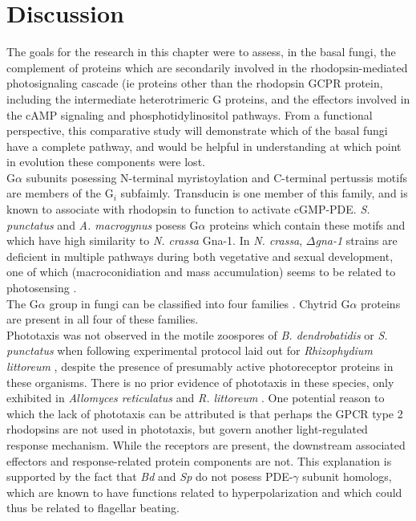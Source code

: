 \section{Discussion}
The goals for the research in this chapter were to assess, in the basal fungi, the complement of proteins which are secondarily involved in the rhodopsin-mediated photosignaling cascade (ie proteins other than the rhodopsin GCPR protein, including the intermediate heterotrimeric G proteins, and the effectors involved in the cAMP signaling and phosphotidylinositol pathways. From a functional perspective, this comparative study will demonstrate which of the basal fungi have a complete pathway, and would be helpful in understanding at which point in evolution these components were lost.\\
\indent G$\alpha$ subunits posessing N-terminal myristoylation and C-terminal pertussis motifs are members of the G$_{i}$ subfaimly. Transducin is one member of this family, and is known to associate with rhodopsin to function to activate cGMP-PDE. \textit{S. punctatus} and \textit{A. macrogynus} posess G$\alpha$ proteins which contain these motifs and which have high similarity to \textit{N. crassa} Gna-1. In \textit{N. crassa}, \emph{$\Delta$gna-1} strains are deficient in multiple pathways during both vegetative and sexual development, one of which (macroconidiation and mass accumulation) seems to be related to photosensing \cite{Ivey1996}.\\
\indent The G$\alpha$ group in fungi can be classified into four families \cite{Bolker1998}. Chytrid G$\alpha$ proteins are present in all four of these families. \\
\indent Phototaxis was not observed in the motile zoospores of \textit{B. dendrobatidis} or \textit{S. punctatus} when following experimental protocol laid out for \textit{Rhizophydium littoreum} \cite{Muehlstein1987}, despite the presence of presumably active photoreceptor proteins in these organisms. There is no prior evidence of phototaxis in these species, only exhibited in \textit{Allomyces reticulatus} \cite{Saranak1997} and \textit{R. littoreum} \cite{Muehlstein1987}. One potential reason to which the lack of phototaxis can be attributed is that perhaps the GPCR type 2 rhodopsins are not used in phototaxis, but govern another light-regulated response mechanism. While the receptors are present, the downstream associated effectors and response-related protein components are not. This explanation is supported by the fact that \textit{Bd} and \textit{Sp} do not posess PDE-$\gamma$ subunit homologs, which are known to have functions related to hyperpolarization and which could thus be related to flagellar beating.\\
